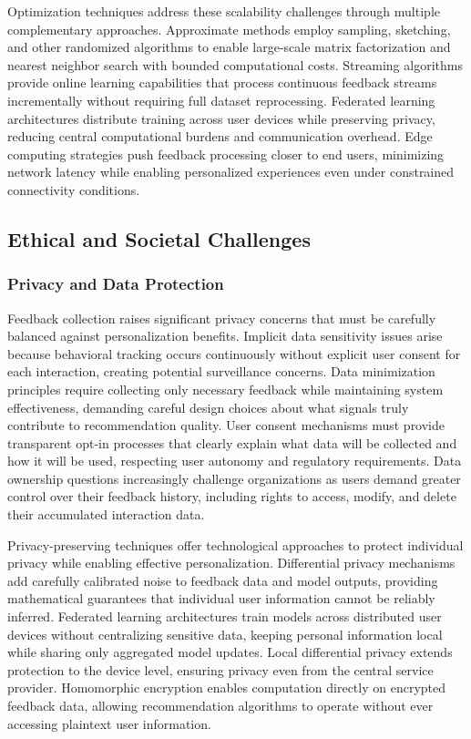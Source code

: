 Optimization techniques address these scalability challenges through multiple complementary approaches. Approximate methods employ sampling, sketching, and other randomized algorithms to enable large-scale matrix factorization and nearest neighbor search with bounded computational costs. Streaming algorithms provide online learning capabilities that process continuous feedback streams incrementally without requiring full dataset reprocessing. Federated learning architectures distribute training across user devices while preserving privacy, reducing central computational burdens and communication overhead. Edge computing strategies push feedback processing closer to end users, minimizing network latency while enabling personalized experiences even under constrained connectivity conditions.

\subsection{Ethical and Societal Challenges}

\subsubsection{Privacy and Data Protection}

Feedback collection raises significant privacy concerns that must be carefully balanced against personalization benefits. Implicit data sensitivity issues arise because behavioral tracking occurs continuously without explicit user consent for each interaction, creating potential surveillance concerns. Data minimization principles require collecting only necessary feedback while maintaining system effectiveness, demanding careful design choices about what signals truly contribute to recommendation quality. User consent mechanisms must provide transparent opt-in processes that clearly explain what data will be collected and how it will be used, respecting user autonomy and regulatory requirements. Data ownership questions increasingly challenge organizations as users demand greater control over their feedback history, including rights to access, modify, and delete their accumulated interaction data.

Privacy-preserving techniques offer technological approaches to protect individual privacy while enabling effective personalization. Differential privacy mechanisms add carefully calibrated noise to feedback data and model outputs, providing mathematical guarantees that individual user information cannot be reliably inferred. Federated learning architectures train models across distributed user devices without centralizing sensitive data, keeping personal information local while sharing only aggregated model updates. Local differential privacy extends protection to the device level, ensuring privacy even from the central service provider. Homomorphic encryption enables computation directly on encrypted feedback data, allowing recommendation algorithms to operate without ever accessing plaintext user information.

